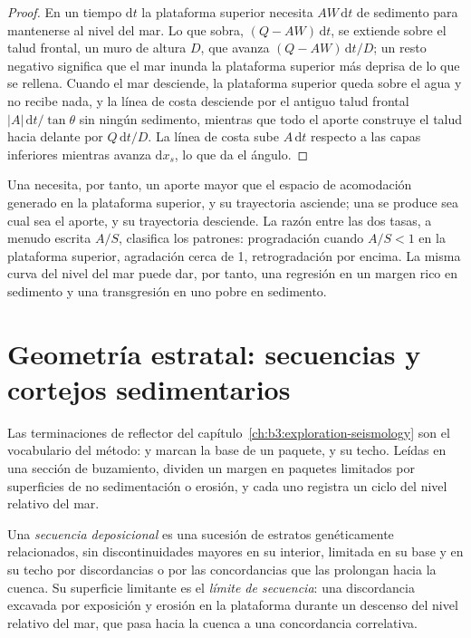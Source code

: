 \begin{proof}
En un tiempo $\mathrm dt$ la plataforma superior necesita $AW\,\mathrm dt$ de sedimento para
mantenerse al nivel del mar. Lo que sobra, $(Q - AW)\,\mathrm dt$, se extiende sobre el talud frontal,
un muro de altura $D$, que avanza $(Q - AW)\,\mathrm dt/D$; un resto negativo
significa que el mar inunda la plataforma superior más deprisa de lo que se rellena. Cuando el mar
desciende, la plataforma superior queda sobre el agua y no recibe nada, y la línea de costa
desciende por el antiguo talud frontal $|A|\,\mathrm dt/\tan\theta$ sin ningún
sedimento, mientras que todo el aporte construye el talud hacia delante por $Q\,\mathrm
dt/D$. La línea de costa sube $A\,\mathrm dt$ respecto a las capas inferiores
mientras avanza $\mathrm dx_s$, lo que da el ángulo.
\end{proof}

Una  necesita, por tanto, un aporte mayor que el espacio de acomodación
generado en la plataforma superior, y su trayectoria asciende; una  se produce
sea cual sea el aporte, y su trayectoria desciende. La razón entre las dos tasas,
a menudo escrita $A/S$, clasifica los patrones: progradación cuando $A/S < 1$ en la
plataforma superior, agradación cerca de 1, retrogradación por encima. La misma curva del nivel del mar
puede dar, por tanto, una regresión en un margen rico en sedimento y una
transgresión en uno pobre en sedimento.

\section{Geometría estratal: secuencias y cortejos sedimentarios}\label{sec:b3:sequence-stratigraphy:sequences}

Las terminaciones de reflector del capítulo~\ref{ch:b3:exploration-seismology}
son el vocabulario del método:  y  marcan la base de un
paquete,  y  su techo. Leídas en una sección de buzamiento,
dividen un margen en paquetes limitados por superficies de no sedimentación o
erosión, y cada uno registra un ciclo del nivel relativo del mar.

\begin{definition}\label{def:b3:sequence-stratigraphy:sequence}
Una \emph{secuencia deposicional} es una sucesión
de estratos genéticamente relacionados, sin discontinuidades mayores en su interior, limitada en su base
y en su techo por discordancias o por las concordancias que las prolongan hacia la
cuenca. Su superficie limitante es el \emph{límite
de secuencia}: una discordancia excavada por exposición y
erosión en la plataforma durante un descenso del nivel relativo del mar, que pasa hacia la cuenca
a una concordancia correlativa.
\end{definition}

